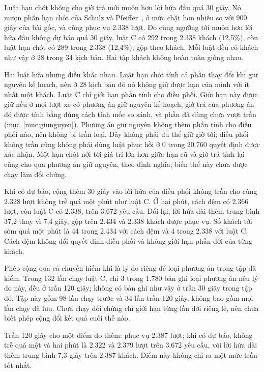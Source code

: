 Luật hạn chót không cho giờ trả mới muộn hơn lời hứa đầu quá 30 giây. Nó mượn phần hạn chót của Schulz và
Pfeiffer~\cite{schulz2026}, ở mức chặt hơn nhiều so với 900 giây của bài gốc, và cũng phục vụ 2.338 lượt.
Đo cùng ngưỡng tới muộn hơn lời hứa đầu không dự báo quá 30 giây, luật C có 292 trong 2.338 khách
(12,5\%), còn luật hạn chót có 289 trong 2.338 (12,4\%), gộp theo khách. Mỗi luật đều có khách như vậy
ở 28 trong 34 kịch bản. Hai tập khách không hoàn toàn giống nhau.

Hai luật hứa những điều khác nhau. Luật hạn chót tính cả phần thay đổi khi giữ nguyên kế hoạch, nên ở
28 kịch bản đó nó không giữ được hạn của mình với ít nhất một khách. Luật C chỉ giới hạn phần tính cho
điều phối. Giới hạn này được giữ nếu ở mọi lượt xe có phương án giữ nguyên kế hoạch, giờ trả của phương án
đó được tính bằng đúng cách tính mốc so sánh, và phần đã dùng chưa vượt trần
(mục~\ref{muc:giunguyen}). Phương án giữ nguyên không thêm phần tính cho điều phối nào, nên không bị
trần loại. Đây không phải ưu thế giữ giờ tới; điều phối không trần cũng không phải dùng luật phục hồi
ở 0 trong 20.760 quyết định được xác nhận. Một hạn chót nới tới giá trị lớn hơn giữa hạn cũ và giờ
trả tính lại cũng cho qua phương án giữ nguyên, theo định nghĩa; biến thể này chưa được chạy làm đối chứng.

Khi có dự báo, cộng thêm 30 giây vào lời hứa của điều phối không trần cho cùng 2.328 lượt không trễ quá
một phút như luật C. Ở hai phút, cách đệm có 2.366 lượt, còn luật C có 2.338, trên 3.672 yêu cầu.
Đổi lại, lời hứa dài thêm trung bình 37,2 thay vì 7,4 giây, gộp trên 2.434 và 2.338 khách được phục vụ.
Số khách tới sớm quá một phút là 44 trong 2.434 với cách đệm và 4 trong 2.338 với luật C.
Cách đệm không đổi quyết định điều phối và không giới hạn phần dời của từng khách.

Phép cộng qua cả chuyến hiếm khi là lý do riêng để loại phương án trong tập đã kiểm. Trong 132 lần chạy
luật C, chỉ 3 trong 1.780 bản ghi loại phương án nêu lý do này, đều ở trần 120 giây; không có bản ghi
như vậy ở trần 30 giây trong tập đó. Tập này gồm 98 lần chạy trước và 34 lần trần 120 giây, không
bao gồm mọi lần chạy đã lưu. Chưa chạy đối chứng chỉ giới hạn từng lần dời riêng lẻ, nên chưa biết
phép cộng đổi kết quả cuối thế nào.

Trần 120 giây cho một điểm đo thêm: phục vụ 2.387 lượt; khi có dự báo, không trễ quá một và hai phút là
2.322 và 2.379 lượt trên 3.672 yêu cầu, với lời hứa dài thêm trung bình 7,3 giây trên 2.387 khách.
Điểm này không chỉ ra một mức trần tốt nhất.

